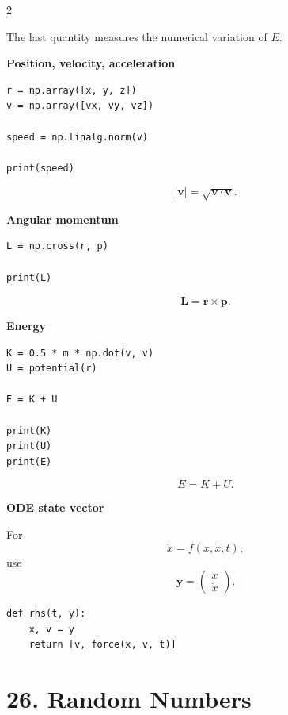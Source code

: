 \documentclass[10pt,a4paper]{article}
\begin{document}
\begin{multicols}{2}
\begin{card}
The last quantity measures the numerical variation of $E$.
\end{card}

\begin{card}
\textbf{Position, velocity, acceleration}

\begin{lstlisting}[style=pythonstyle]
r = np.array([x, y, z])
v = np.array([vx, vy, vz])

speed = np.linalg.norm(v)

print(speed)
\end{lstlisting}

\[
|\mathbf v|
=
\sqrt{\mathbf v\cdot\mathbf v}.
\]
\end{card}

\begin{card}
\textbf{Angular momentum}

\begin{lstlisting}[style=pythonstyle]
L = np.cross(r, p)

print(L)
\end{lstlisting}

\[
\mathbf L=\mathbf r\times\mathbf p.
\]
\end{card}

\begin{card}
\textbf{Energy}

\begin{lstlisting}[style=pythonstyle]
K = 0.5 * m * np.dot(v, v)
U = potential(r)

E = K + U

print(K)
print(U)
print(E)
\end{lstlisting}

\[
E=K+U.
\]
\end{card}

\begin{card}
\textbf{ODE state vector}

For
\[
\ddot{x}=f(x,\dot{x},t),
\]
use
\[
\mathbf y=
\begin{pmatrix}
x\\
\dot{x}
\end{pmatrix}.
\]

\begin{lstlisting}[style=pythonstyle]
def rhs(t, y):
    x, v = y
    return [v, force(x, v, t)]
\end{lstlisting}
\end{card}

\section*{26. Random Numbers}


\end{multicols}
\end{document}
